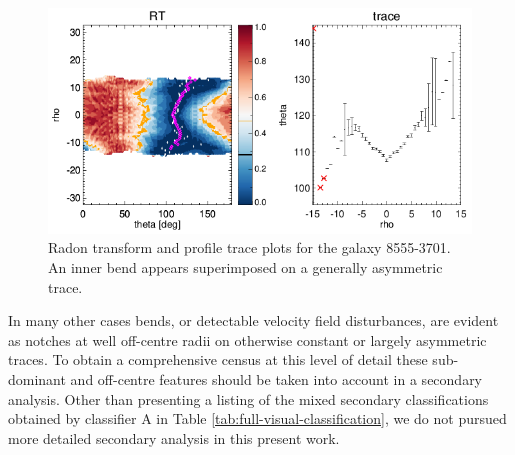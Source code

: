 \begin{figure}
    \centering
    \includegraphics[width=\columnwidth]{images/RadonPlots/RT-SNIPS-NEW/8555-3701-A+IB.png}
    \caption[Radon transform and profile trace plots for the galaxy 8555-3701]{Radon transform and profile trace plots for the galaxy 8555-3701. An inner bend appears superimposed on a generally asymmetric trace.}
    \label{fig:8555-3701-A+IB}
\end{figure}

In many other cases bends, or detectable velocity field disturbances, are evident as notches at well off-centre radii on otherwise constant or largely asymmetric traces. To obtain a comprehensive census at this level of detail these sub-dominant and off-centre features should be taken into account in a secondary analysis. Other than presenting a listing of the mixed secondary classifications obtained by classifier A in Table \ref{tab:full-visual-classification}, we do not pursued more detailed secondary analysis in this present work.




